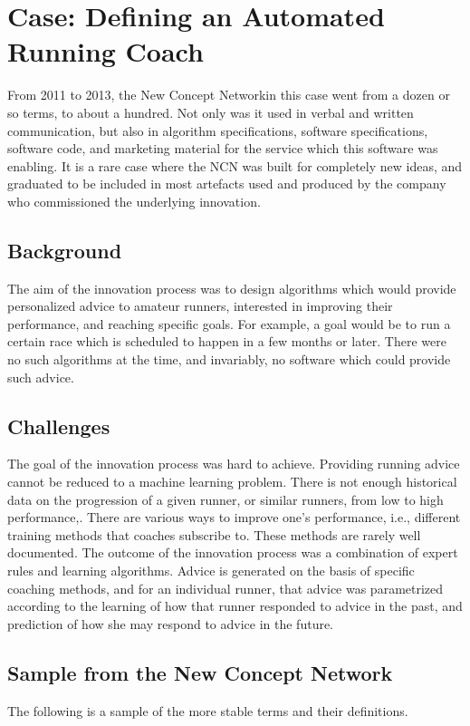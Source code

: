 \documentclass[graybox,envcountchap,sectrefs]{svmono}
\newcommand{\ncn}{NCN}
\newcommand{\ncnf}{New Concept Network}
\begin{document}
\printbibliography


\chapter{Case: Defining an Automated Running Coach}\label{c:case:defining-automated-running-coach}

From 2011 to 2013, the \ncnf in this case went from a dozen or so terms, to about a hundred. Not only was it used in verbal and written communication, but also in algorithm specifications, software specifications, software code, and marketing material for the service which this software was enabling. It is a rare case where the \ncn{} was built for completely new ideas, and graduated to be included in most artefacts used and produced by the company who commissioned the underlying innovation.

\section{Background}
The aim of the innovation process was to design algorithms which would provide personalized advice to amateur runners, interested in improving their performance, and reaching specific goals. For example, a goal would be to run a certain race which is scheduled to happen in a few months or later. There were no such algorithms at the time, and invariably, no software which could provide such advice.

\section{Challenges}
The goal of the innovation process was hard to achieve. Providing running advice cannot be reduced to a machine learning problem. There is not enough historical data on the progression of a given runner, or similar runners, from low to high performance,. There are various ways to improve one's performance, i.e., different training methods that coaches subscribe to. These methods are rarely well documented. The outcome of the innovation process was a combination of expert rules and learning algorithms. Advice is generated on the basis of specific coaching methods, and for an individual runner, that advice was parametrized according to the learning of how that runner responded to advice in the past, and prediction of how she may respond to advice in the future. 

\section{Sample from the \ncnf}
The following is a sample of the more stable terms and their definitions. 
\end{document}

